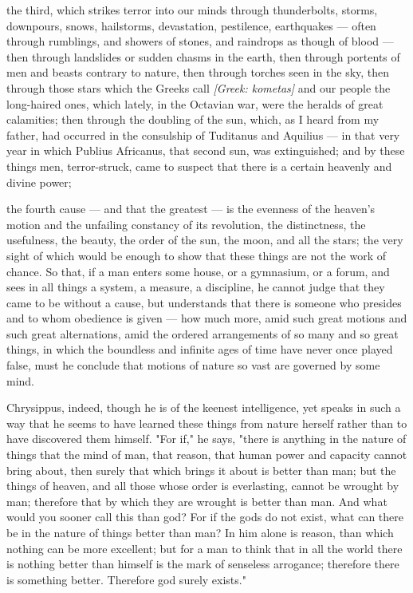  the third, which strikes terror into our minds through thunderbolts, storms, downpours, snows, hailstorms, devastation, pestilence, earthquakes — often through rumblings, and showers of stones, and raindrops as though of blood — then through landslides or sudden chasms in the earth, then through portents of men and beasts contrary to nature, then through torches seen in the sky, then through those stars which the Greeks call \textit{[Greek: kometas]} and our people the long-haired ones, which lately, in the Octavian war, were the heralds of great calamities; then through the doubling of the sun, which, as I heard from my father, had occurred in the consulship of Tuditanus and Aquilius — in that very year in which Publius Africanus, that second sun, was extinguished; and by these things men, terror-struck, came to suspect that there is a certain heavenly and divine power;

 the fourth cause — and that the greatest — is the evenness of the heaven's motion and the unfailing constancy of its revolution, the distinctness, the usefulness, the beauty, the order of the sun, the moon, and all the stars; the very sight of which would be enough to show that these things are not the work of chance. So that, if a man enters some house, or a gymnasium, or a forum, and sees in all things a system, a measure, a discipline, he cannot judge that they came to be without a cause, but understands that there is someone who presides and to whom obedience is given — how much more, amid such great motions and such great alternations, amid the ordered arrangements of so many and so great things, in which the boundless and infinite ages of time have never once played false, must he conclude that motions of nature so vast are governed by some mind.

 Chrysippus, indeed, though he is of the keenest intelligence, yet speaks in such a way that he seems to have learned these things from nature herself rather than to have discovered them himself. "For if," he says, "there is anything in the nature of things that the mind of man, that reason, that human power and capacity cannot bring about, then surely that which brings it about is better than man; but the things of heaven, and all those whose order is everlasting, cannot be wrought by man; therefore that by which they are wrought is better than man. And what would you sooner call this than god? For if the gods do not exist, what can there be in the nature of things better than man? In him alone is reason, than which nothing can be more excellent; but for a man to think that in all the world there is nothing better than himself is the mark of senseless arrogance; therefore there is something better. Therefore god surely exists."

